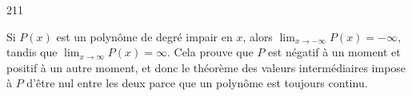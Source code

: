 

\begin{corrige}{211}

Si $P(x)$ est un polynôme de degré impair en $x$, alors $\lim_{x\to-\infty}P(x)=-\infty$, tandis que $\lim_{x\to\infty}P(x)=\infty$. Cela prouve que $P$ est négatif à un moment et positif à un autre moment, et donc le théorème des valeurs intermédiaires impose à $P$ d'être nul entre les deux parce que un polynôme est toujours continu.

\end{corrige}
